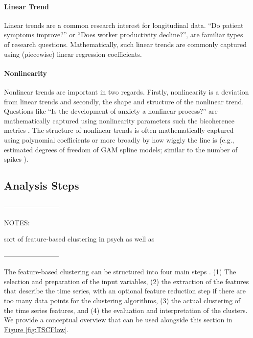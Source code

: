 \documentclass[man, 12pt, a4paper, mask, floatsintext]{apa7}
\theoremstyle{break}
\theoremstyle{plain}
\newcommand{\fgrref}[2][]{\hyperref[#2]{Figure \ref*{#2}#1}}
\begin{document}
\paragraph{Linear Trend} Linear trends are a common research interest for longitudinal data. ``Do patient symptoms improve?'' or ``Does worker productivity decline?'', are familiar types of research questions. Mathematically, such linear trends are commonly captured using (piecewise) linear regression coefficients. 

\paragraph{Nonlinearity} Nonlinear trends are important in two regards. Firstly, nonlinearity is a deviation from linear trends and secondly, the shape and structure of the nonlinear trend. Questions like ``Is the development of anxiety a nonlinear process?'' are mathematically captured using nonlinearity parameters such the bicoherence metrics \citep{cuddy2009}. The structure of nonlinear trends is often mathematically captured using polynomial coefficients or more broadly by how wiggly the line is (e.g., estimated degrees of freedom of GAM spline models; similar to the number of spikes \citealp[]{caro-martin2018}). 

\subsection{Analysis Steps}

------------------------

NOTES:

\noindent sort of feature-based clustering in psych \citep{heylen2016} as well as \citep{krone2018}

------------------------

The feature-based clustering can be structured into four main steps \citep{rasanen2009, wang2006}. (1) The selection and preparation of the input variables, (2) the extraction of the features that describe the time series, with an optional feature reduction step if there are too many data points for the clustering algorithms, (3) the actual clustering of the time series features, and (4) the evaluation and interpretation of the clusters. We provide a conceptual overview that can be used alongside this section in \fgrref{fig:TSCFlow}. 
\end{document}
